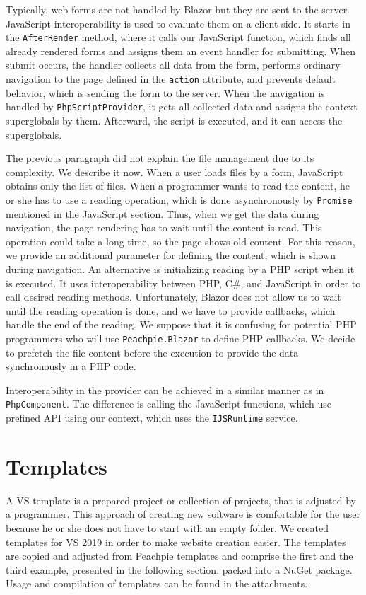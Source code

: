 Typically, web forms are not handled by Blazor but they are sent to the server.
JavaScript interoperability is used to evaluate them on a client side.
It starts in the \texttt{AfterRender} method, where it calls our JavaScript function, which finds all already rendered forms and assigns them an event handler for submitting.
When submit occurs, the handler collects all data from the form, performs ordinary navigation to the page defined in the \texttt{action} attribute, and prevents default behavior, which is sending the form to the server.
When the navigation is handled by \texttt{PhpScriptProvider}, it gets all collected data and assigns the context superglobals by them.
Afterward, the script is executed, and it can access the superglobals.
\par
The previous paragraph did not explain the file management due to its complexity.
We describe it now.
When a user loads files by a form, JavaScript obtains only the list of files. 
When a programmer wants to read the content, he or she has to use a reading operation, which is done asynchronously by \texttt{Promise} mentioned in the JavaScript section.
Thus, when we get the data during navigation, the page rendering has to wait until the content is read.
This operation could take a long time, so the page shows old content.
For this reason, we provide an additional parameter for defining the content, which is shown during navigation.
An alternative is initializing reading by a PHP script when it is executed.
It uses interoperability between PHP, C\#, and JavaScript in order to call desired reading methods.
Unfortunately, Blazor does not allow us to wait until the reading operation is done, and we have to provide callbacks, which handle the end of the reading.
We suppose that it is confusing for potential PHP programmers who will use \texttt{Peachpie.Blazor} to define PHP callbacks.
We decide to prefetch the file content before the execution to provide the data synchronously in a PHP code.
\par
Interoperability in the provider can be achieved in a similar manner as in \texttt{PhpComponent}.
The difference is calling the JavaScript functions, which use prefined API using our context, which uses the \texttt{IJSRuntime} service.

\section{Templates}

A \ac{VS} template is a prepared project or collection of projects, that is adjusted by a programmer.
This approach of creating new software is comfortable for the user because he or she does not have to start with an empty folder.
We created templates for VS 2019 in order to make website creation easier.
The templates are copied and adjusted from Peachpie templates \cite{online:templates} and comprise the first and the third example, presented in the following section, packed into a NuGet package.
Usage and compilation of templates can be found in the attachments.
 